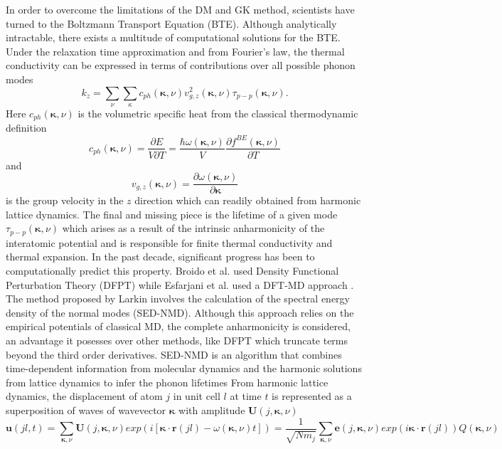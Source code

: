 In order to overcome the limitations of the DM and GK method, scientists have turned to the Boltzmann Transport Equation (BTE). Although analytically intractable, there exists a multitude of computational solutions for the BTE. Under the relaxation time approximation and from Fourier's law, the thermal conductivity can be expressed in terms of contributions over all possible phonon modes \cite{sellan_CP}
%
\begin{equation}
	k_{z}= \sum_\nu\sum_\kappa c_{ph}(\bm{\kappa},\nu)v^2_{g,z}(\bm{\kappa}, \nu)\tau_{p-p}(\bm{\kappa}, \nu).
\end{equation}
%
Here $c_{ph}(\bm{\kappa},\nu)$ is the volumetric specific heat from the classical thermodynamic definition
%
\begin{equation}
c_{ph}(\bm{\kappa},\nu)=\frac{\partial E}{V\partial T}=\frac{\hbar\omega(\bm{\kappa},\nu)}{V}\frac{\partial f^{BE}(\bm{\kappa}, \nu)}{\partial T}	
\end{equation}
%
and
\begin{equation}
v_{g,z}(\bm{\kappa}, \nu)=\frac{\partial \omega(\bm{\kappa},\nu)}{\partial \bm{\kappa}}
\end{equation}
is the group velocity in the $z$ direction which can readily obtained from harmonic lattice dynamics. The final and missing piece is the lifetime of a given mode $\tau_{p-p}(\bm{\kappa}, \nu)$ which arises as a result of the intrinsic anharmonicity of the interatomic potential and is responsible for finite thermal conductivity and thermal expansion. In the past decade, significant progress has been to computationally predict this property. Broido et al. used Density Functional Perturbation Theory (DFPT) \cite{Broido1} while Esfarjani et al. used a DFT-MD approach \cite{PhysRevB.84.085204}. The method proposed by Larkin \cite{larkin} involves the calculation of the spectral energy density of the normal modes (SED-NMD). Although this approach relies on the empirical potentials of classical MD, the complete anharmonicity is considered, an advantage it posesses over other methods, like DFPT which truncate terms beyond the third order derivatives. SED-NMD is an algorithm that combines time-dependent information from molecular dynamics and the harmonic solutions from lattice dynamics to infer the phonon lifetimes From harmonic lattice dynamics, the displacement of atom $j$ in unit cell $l$ at time $t$ is represented as a superposition of waves of wavevector $\bm{\kappa}$ with amplitude $\bm{U}(j,\bm{\kappa},\nu)$
\begin{equation}
\bm{u}(jl,t)=\sum_{\bm{\kappa},\nu}\bm{U}(j,\bm{\kappa},\nu)exp(i[\bm{\kappa}\cdot\bm{r}(jl)-\omega(\bm{\kappa},\nu)t])=\frac{1}{\sqrt{Nm_j}}\sum_{\bm{\kappa},\nu}\bm{e}(j,\bm{\kappa},\nu)exp(i\bm{\kappa}\cdot\bm{r}(jl))Q(\bm{\kappa},\nu)
\end{equation}
